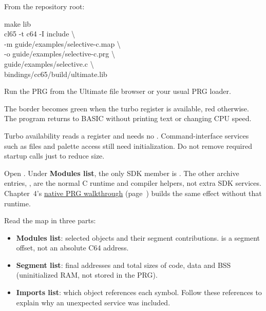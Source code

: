 \begin{listingbox}[before upper={}]

\end{listingbox}

From the repository root:
\begin{listingbox}
make lib\\
cl65 -t c64 -I include \textbackslash\\
\hspace*{1em}-m guide/examples/selective-c.map \textbackslash\\
\hspace*{1em}-o guide/examples/selective-c.prg \textbackslash\\
\hspace*{1em}guide/examples/selective.c \textbackslash\\
\hspace*{1em}bindings/cc65/build/ultimate.lib
\end{listingbox}

Run the PRG from the Ultimate file browser or your usual PRG loader.
\begin{resultbox}
The border becomes green when the turbo register is available, red otherwise.
The program returns to BASIC without printing text or changing CPU speed.
\end{resultbox}

Turbo availability reads a register and needs no .
Command-interface services such as files and palette access still need
initialization. Do not remove required startup calls just to reduce size.

Open . Under \textbf{Modules list}, the
only SDK member is . The other archive entries,
, are the normal C runtime and compiler helpers, not extra
SDK services. Chapter~4's \hyperref[sec:native-selective]{native PRG walkthrough}
(page~\pageref{sec:native-selective}) builds the same effect without that runtime.

Read the map in three parts:
\begin{itemize}
\item \textbf{Modules list}: selected objects and their segment contributions.
   is a segment offset, not an absolute C64 address.
\item \textbf{Segment list}: final addresses and total sizes of code, data and
  BSS (uninitialized RAM, not stored in the PRG).
\item \textbf{Imports list}: which object references each symbol. Follow these
  references to explain why an unexpected service was included.
\end{itemize}


